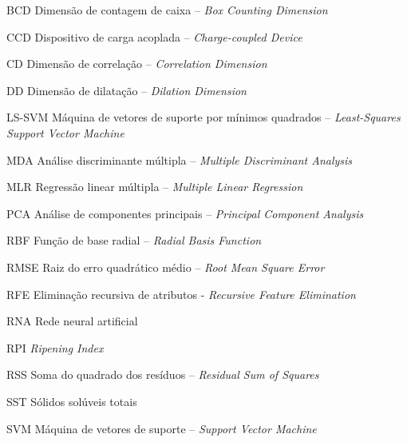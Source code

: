 \begin{siglas}
	\item[BCD]		Dimensão de contagem de caixa – \textit{Box Counting Dimension}
	\item[CCD]		Dispositivo de carga acoplada – \textit{Charge-coupled Device}
	\item[CD]		Dimensão de correlação – \textit{Correlation Dimension}
	\item[DD]		Dimensão de dilatação – \textit{Dilation Dimension}
	\item[LS-SVM]		Máquina de vetores de suporte por mínimos quadrados – \textit{Least-Squares Support Vector Machine}
	\item[MDA]		Análise discriminante múltipla – \textit{Multiple Discriminant Analysis}
	\item[MLR]		Regressão linear múltipla – \textit{Multiple Linear Regression}
	\item[PCA]		Análise de componentes principais – \textit{Principal Component Analysis}
	\item[RBF]		Função de base radial – \textit{Radial Basis Function}
	\item[RMSE]		Raiz do erro quadrático médio – \textit{Root Mean Square Error}
	\item[RFE]		Eliminação recursiva de atributos - \textit{Recursive Feature Elimination}
	\item[RNA]		Rede neural artificial
	\item[RPI]		\textit{Ripening Index}
	\item[RSS]		Soma do quadrado dos resíduos – \textit{Residual Sum of Squares}
	\item[SST]		Sólidos solúveis totais
	\item[SVM]		Máquina de vetores de suporte – \textit{Support Vector Machine}
	    
\end{siglas}

\tableofcontents*
\cleardoublepage
